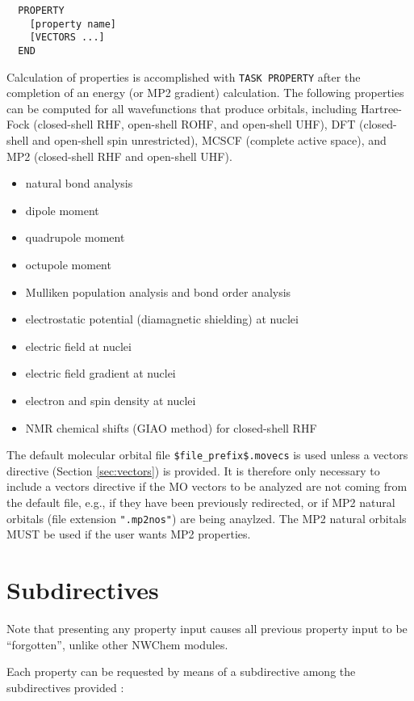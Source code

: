 \label{sec:property}
\begin{verbatim}
  PROPERTY
    [property name]
    [VECTORS ...]
  END
\end{verbatim}

Calculation of properties is accomplished with \verb+TASK PROPERTY+
after the completion of an energy (or MP2 gradient) calculation.  The
following properties can be computed for all wavefunctions that produce
orbitals, including Hartree-Fock (closed-shell RHF, open-shell ROHF, and
open-shell UHF), DFT (closed-shell and open-shell spin unrestricted),
MCSCF (complete active space), and MP2 (closed-shell RHF and open-shell
UHF).

\begin{itemize}
\item natural bond analysis
\item dipole moment
\item quadrupole moment
\item octupole moment
\item Mulliken population analysis and bond order analysis
\item electrostatic potential (diamagnetic shielding) at nuclei 
\item electric field at nuclei 
\item electric field gradient at nuclei 
\item electron and spin density at nuclei 
\item NMR chemical shifts (GIAO method) for closed-shell RHF
\end{itemize}

The default molecular orbital file \verb+$file_prefix$.movecs+ is used
unless a vectors directive (Section \ref{sec:vectors}) is provided.  It is
therefore only necessary to include a vectors directive if the MO vectors
to be analyzed are not coming from the default file, e.g., if they have
been previously redirected, or if MP2 natural orbitals (file extension
\verb+".mp2nos"+) are being anaylzed.  The MP2 natural orbitals MUST be
used if the user wants MP2 properties.

\section{Subdirectives}

Note that presenting any property input causes all previous property input
to be ``forgotten'', unlike other NWChem modules.

Each property can be requested by means of a subdirective among the
subdirectives provided :

